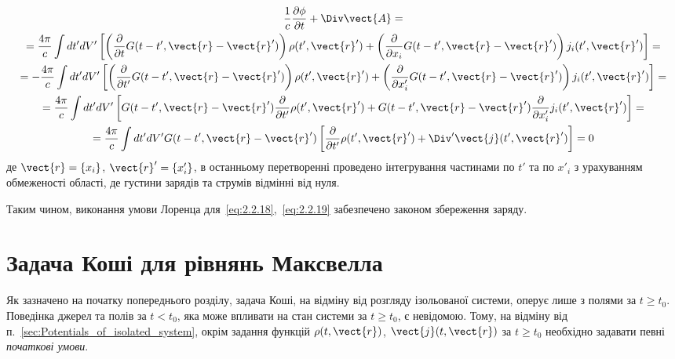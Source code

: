 \begin{multline*}
	\frac1c \frac{\partial \phi}{\partial t} + \Div\vect{A} = \\
	= \frac{4\pi}{c} \int dt' dV' \left[ \left( \frac{\partial}{\partial t} G(t - t', \vect{r} - \vect{r}') \right) \rho (t', \vect{r}') + \left(
		\frac{\partial}{\partial x_i} G(t - t', \vect{r} - \vect{r}') \right) j_i (t', \vect{r}') \right] = \\
	= -\frac{4\pi}{c} \int dt' dV' \left[  \left( \frac{\partial}{\partial t'} G(t - t', \vect{r} - \vect{r}') \right) \rho (t', \vect{r}') + \left(
		\frac{\partial}{\partial x'_i} G(t - t', \vect{r} - \vect{r}') \right) j_i (t', \vect{r}') \right] = \\
	= \frac{4\pi}{c} \int dt' dV' \left[ G(t - t', \vect{r} - \vect{r}') \frac{\partial}{\partial t'} \rho (t', \vect{r}') + G(t - t', \vect{r} -
		\vect{r}') \frac{\partial}{\partial x'_i} j_i (t', \vect{r}') \right] = \\
	= \frac{4\pi}{c} \int dt' dV' G(t - t', \vect{r} - \vect{r}') \left[ \frac{\partial}{\partial t'} \rho (t', \vect{r}') + \Div'\vect{j}
		(t', \vect{r}') \right] = 0
\end{multline*}
де \( \vect{r} = \{ x_i \} \), \( \vect{r}' = \{ x'_i \} \), в останньому перетворенні проведено інтегрування частинами
по \( t' \) та по \( x'_i \) з урахуванням обмеженості області, де густини зарядів та струмів відмінні від нуля.

Таким чином, виконання умови Лоренца для~\eqref{eq:2.2.18},~\eqref{eq:2.2.19} забезпечено законом збереження заряду.

\section{Задача Коші для рівнянь Максвелла}\label{sec:Cauchi}


Як зазначено на початку попереднього розділу, задача Коші, на відміну від розгляду ізольованої системи, оперує лише з
полями за \( t \geqslant t_0 \). Поведінка джерел та полів за \( t < t_0 \), яка може впливати на стан системи за \( t
\geqslant t_0 \), є невідомою. Тому, на відміну від п.~\ref{sec:Potentials_of_isolated_system}, окрім задання функцій \(
\rho(t, \vect{r}) \), \( \vect{j}(t, \vect{r}) \) за \( t \geqslant t_0 \) необхідно задавати певні \emph{початкові
умови}.


